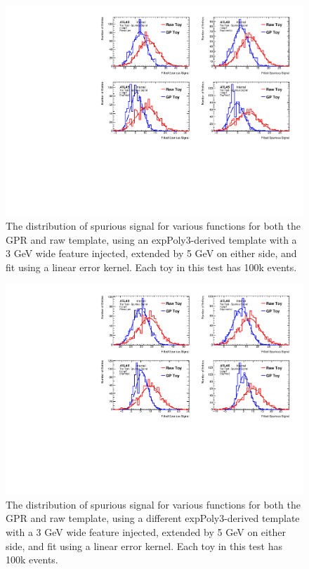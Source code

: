 \begin{figure} 
\begin{center}
  \includegraphics[width=\textwidth]{figures/background/gpr/validation/linear/ToyTest_FitSigVals_medpT_100k_Sig}   
\caption{The distribution of spurious signal for various functions for both the GPR and raw template, using an expPoly3-derived template with a 3 GeV wide feature injected, extended by 5 GeV on either side, and fit using a linear error kernel. Each toy in this test has 100k events.}
\label{fig:linearkernel_medpt_100k_Sig}
\end{center}
\end{figure}

\begin{figure} 
\begin{center}
  \includegraphics[width=\textwidth]{figures/background/gpr/validation/linear/ToyTest_FitSigVals_highpT_100k_Sig}   
\caption{The distribution of spurious signal for various functions for both the GPR and raw template, using a different expPoly3-derived template with a 3 GeV wide feature injected, extended by 5 GeV on either side, and fit using a linear error kernel. Each toy in this test has 100k events.}
\label{fig:linearkernel_highpt_100k_Sig}
\end{center}
\end{figure}

